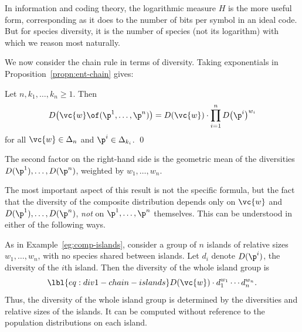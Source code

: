 In information and coding theory, the logarithmic measure $H$ is the
more useful form, corresponding as it does to the number of bits per symbol
in an ideal code.  But for species diversity, it is the number of
species (not its logarithm) with which we reason most naturally.

We now consider the chain rule in terms of diversity.  Taking exponentials
in Proposition~\ref{propn:ent-chain} gives:

\begin{cor}
Let $n, k_1, \ldots, k_n \geq 1$.  Then
\[
D\bigl(\vc{w} \of (\p^1, \ldots, \p^n)\bigr)
=
D(\vc{w}) \cdot \prod_{i = 1}^n D\bigl(\p^i\bigr)^{w_i}
\]
for all $\vc{w} \in \Delta_n$ and $\p^i \in \Delta_{k_i}$.
\qed
\end{cor}

The second factor on the right-hand side is the geometric mean of the
diversities $D(\p^1), \ldots, D(\p^n)$, weighted by $w_1, \ldots, w_n$.

The most important aspect of this result is not the specific formula, but
the fact that the diversity of the composite distribution depends only on
$\vc{w}$ and $D(\p^1), \ldots, D(\p^n)$, \emph{not} on $\p^1, \ldots, \p^n$
themselves.  This can be understood in either of the following ways.

\begin{example}
% 
As in Example~\ref{eg:comp-islands}, consider a group of $n$ islands of
relative sizes $w_1, \ldots, w_n$, with no species shared between islands.
Let $d_i$ denote $D(\p^i)$, the diversity of the $i$th island.  Then the
diversity of the whole island group is
% 
\begin{equation}
\lbl{eq:div1-chain-islands}
D(\vc{w}) \cdot d_1^{w_1} \cdots d_n^{w_n}.
\end{equation}
% 
Thus, the diversity of the whole island group is determined by the
diversities and relative sizes of the islands.  It can be computed without
reference to the population distributions on each island.  
\end{example}

